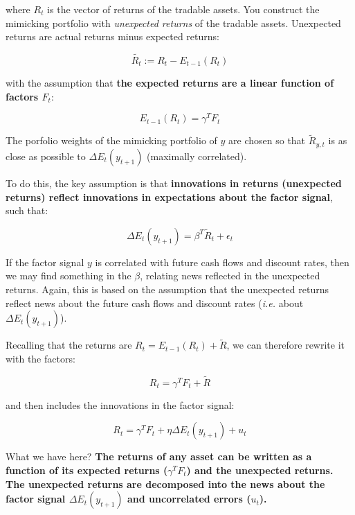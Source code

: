 where $R_t$ is the vector of returns of the tradable assets.
You construct the mimicking portfolio with 
\textit{unexpected returns} of the tradable assets. Unexpected 
returns are actual returns minus expected returns:

\begin{equation}
    \tilde{R_t} := R_t - E_{t-1}(R_t)
\end{equation}

with the assumption that \textbf{the expected returns are a linear 
function of factors $F_{t}$}:

\begin{equation}
    E_{t-1}(R_t) = \gamma^T F_{t}
\end{equation}


The porfolio weights of the mimicking portfolio of $y$ 
are chosen so that $\tilde{R}_{y,t}$ is as close as possible
to $\Delta E_t(y_{t+1})$ (maximally correlated).

To do this, the key assumption is that 
\textbf{innovations in returns (unexpected returns)
reflect innovations in expectations about 
the factor signal}, such that:

\begin{equation}
    \Delta E_t(y_{t+1}) = \beta^T \tilde{R}_t + \epsilon_t
\end{equation}

If the factor signal $y$ is correlated 
with future cash flows and discount rates,
then we may find something in the $\beta$, relating
news reflected in the unexpected returns. 
Again, this is based on the assumption that 
the unexpected returns reflect news about the
future cash flows and discount rates (\textit{i.e.}
about $\Delta E_t(y_{t+1})$).

Recalling that the returns are $R_t = E_{t-1}(R_t) + \tilde{R}$,
we can therefore rewrite it with the factors:

\begin{equation}
    R_t = \gamma^T F_{t} + \tilde{R}
\end{equation}

and then includes the innovations in the factor signal:

\begin{equation}
    R_t = \gamma^T F_{t} + \eta \Delta E_t(y_{t+1}) + u_{t}
\end{equation}

What we have here? 
\textbf{The returns of any asset can be written 
as a function of its expected returns ($\gamma^T F_{t}$)
and the unexpected returns. The unexpected returns are 
decomposed into the news about the factor signal $\Delta E_t (y_{t+1})$ and
uncorrelated errors ($u_t$).}

